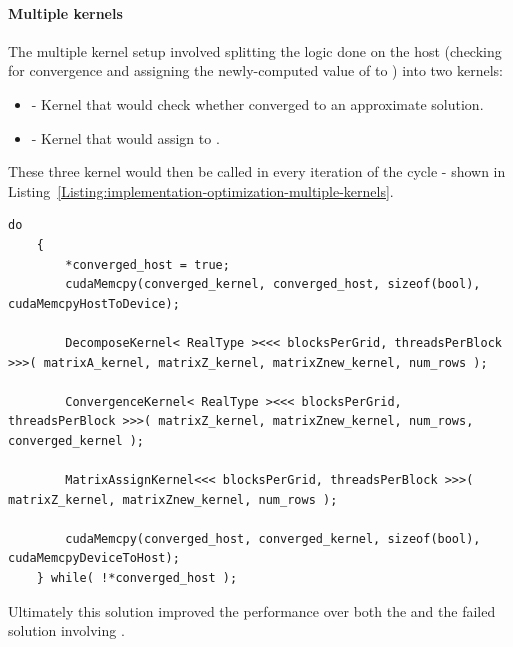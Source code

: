 \paragraph{Multiple kernels} The multiple kernel setup involved splitting the logic done on the host (checking for convergence and assigning the newly-computed value of  to ) into two kernels:

\begin{itemize}
	\item {} - Kernel that would check whether  converged to an approximate solution.
	\item {} - Kernel that would assign  to .
\end{itemize}

These three kernel would then be called in every iteration of the  cycle - shown in Listing~\ref{Listing:implementation-optimization-multiple-kernels}.

\begin{lstlisting}[caption={Solution that replaced the procedure presented on lines~\ref{Line:initial-naive-implementation-convergence-checking-begin} - \ref{Line:initial-naive-implementation-convergence-checking-end} in Listing~\ref{Listing:implementation-optimization-initial-naive-implementation}. Taken from the Decomposition project repository on GitLab\protect\footref{Footnote:decomposition-project-gitlab-url}.},label={Listing:implementation-optimization-multiple-kernels},escapechar=@]
	do
	{
		*converged_host = true;
		cudaMemcpy(converged_kernel, converged_host, sizeof(bool), cudaMemcpyHostToDevice);
		
		DecomposeKernel< RealType ><<< blocksPerGrid, threadsPerBlock >>>( matrixA_kernel, matrixZ_kernel, matrixZnew_kernel, num_rows );
		
		ConvergenceKernel< RealType ><<< blocksPerGrid, threadsPerBlock >>>( matrixZ_kernel, matrixZnew_kernel, num_rows, converged_kernel );
		
		MatrixAssignKernel<<< blocksPerGrid, threadsPerBlock >>>( matrixZ_kernel, matrixZnew_kernel, num_rows );
		
		cudaMemcpy(converged_host, converged_kernel, sizeof(bool), cudaMemcpyDeviceToHost);
	} while( !*converged_host );
\end{lstlisting}

Ultimately this solution improved the performance over both the \textit{} and the failed solution involving \textit{}.

